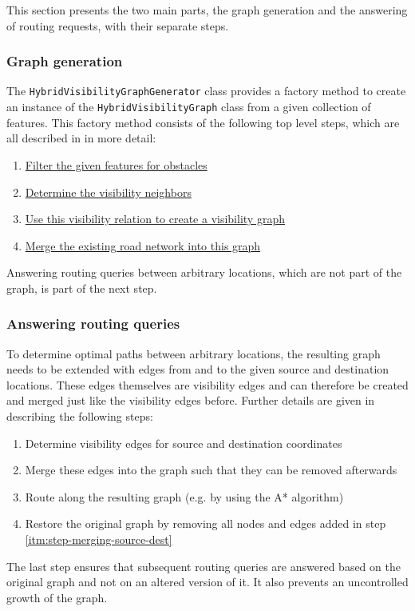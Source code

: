 		This section presents the two main parts, the graph generation and the answering of routing requests, with their separate steps.
		
		\subsubsection{Graph generation}
		\label{subsubsec:graph-generation}
		
			The \texttt{HybridVisibilityGraphGenerator} class provides a factory method to create an instance of the \texttt{HybridVisibilityGraph} class from a given collection of features.
			This factory method consists of the following top level steps, which are all described in  in more detail:
			\begin{enumerate}
				\item \hyperref[subsec:step-1-preprocessing]{Filter the given features for obstacles}
				\item \hyperref[subsec:step-2-knn-search]{Determine the visibility neighbors}
				\item \hyperref[subsec:step-3-graph-creation]{Use this visibility relation to create a visibility graph}
				\item \hyperref[subsec:step-4-graph merging]{Merge the existing road network into this graph}
			\end{enumerate}
			Answering routing queries between arbitrary locations, which are not part of the graph, is part of the next step.
		
		\subsubsection{Answering routing queries}
		
			To determine optimal paths between arbitrary locations, the resulting graph needs to be extended with edges from and to the given source and destination locations.
			These edges themselves are visibility edges and can therefore be created and merged just like the visibility edges before.
			Further details are given in  describing the following steps:
			\begin{enumerate}
				\item Determine visibility edges for source and destination coordinates\label{itm:step-merging-source-dest}
				\item Merge these edges into the graph such that they can be removed afterwards
				\item Route along the resulting graph (e.g. by using the A* algorithm)
				\item Restore the original graph by removing all nodes and edges added in step \ref{itm:step-merging-source-dest}
			\end{enumerate}
			The last step ensures that subsequent routing queries are answered based on the original graph and not on an altered version of it.
			It also prevents an uncontrolled growth of the graph.
	
